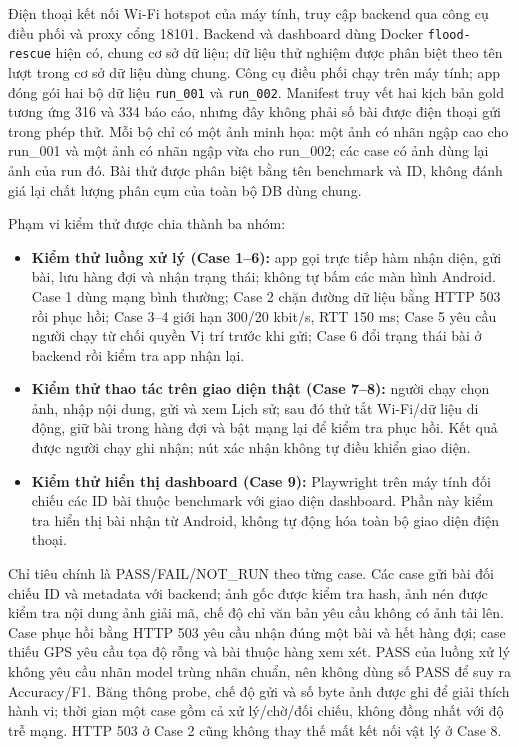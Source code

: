 Điện thoại kết nối Wi-Fi hotspot của máy tính, truy cập backend qua công cụ điều phối và proxy cổng 18101. Backend và dashboard dùng Docker \texttt{flood-rescue} hiện có, chung cơ sở dữ liệu; dữ liệu thử nghiệm được phân biệt theo tên lượt trong cơ sở dữ liệu dùng chung. Công cụ điều phối chạy trên máy tính; app đóng gói hai bộ dữ liệu \texttt{run\_001} và \texttt{run\_002}. Manifest truy vết hai kịch bản gold tương ứng 316 và 334 báo cáo, nhưng đây không phải số bài được điện thoại gửi trong phép thử. Mỗi bộ chỉ có một ảnh minh họa: một ảnh có nhãn ngập cao cho run\_001 và một ảnh có nhãn ngập vừa cho run\_002; các case có ảnh dùng lại ảnh của run đó. Bài thử được phân biệt bằng tên benchmark và ID, không đánh giá lại chất lượng phân cụm của toàn bộ DB dùng chung.

Phạm vi kiểm thử được chia thành ba nhóm:
\begin{itemize}
\item \textbf{Kiểm thử luồng xử lý (Case 1--6):} app gọi trực tiếp hàm nhận diện, gửi bài, lưu hàng đợi và nhận trạng thái; không tự bấm các màn hình Android. Case 1 dùng mạng bình thường; Case 2 chặn đường dữ liệu bằng HTTP 503 rồi phục hồi; Case 3--4 giới hạn 300/20 kbit/s, RTT 150 ms; Case 5 yêu cầu người chạy từ chối quyền Vị trí trước khi gửi; Case 6 đổi trạng thái bài ở backend rồi kiểm tra app nhận lại.
\item \textbf{Kiểm thử thao tác trên giao diện thật (Case 7--8):} người chạy chọn ảnh, nhập nội dung, gửi và xem Lịch sử; sau đó thử tắt Wi-Fi/dữ liệu di động, giữ bài trong hàng đợi và bật mạng lại để kiểm tra phục hồi. Kết quả được người chạy ghi nhận; nút xác nhận không tự điều khiển giao diện.
\item \textbf{Kiểm thử hiển thị dashboard (Case 9):} Playwright trên máy tính đối chiếu các ID bài thuộc benchmark với giao diện dashboard. Phần này kiểm tra hiển thị bài nhận từ Android, không tự động hóa toàn bộ giao diện điện thoại.
\end{itemize}

Chỉ tiêu chính là PASS/FAIL/NOT\_RUN theo từng case. Các case gửi bài đối chiếu ID và metadata với backend; ảnh gốc được kiểm tra hash, ảnh nén được kiểm tra nội dung ảnh giải mã, chế độ chỉ văn bản yêu cầu không có ảnh tải lên. Case phục hồi bằng HTTP 503 yêu cầu nhận đúng một bài và hết hàng đợi; case thiếu GPS yêu cầu tọa độ rỗng và bài thuộc hàng xem xét. PASS của luồng xử lý không yêu cầu nhãn model trùng nhãn chuẩn, nên không dùng số PASS để suy ra Accuracy/F1. Băng thông probe, chế độ gửi và số byte ảnh được ghi để giải thích hành vi; thời gian một case gồm cả xử lý/chờ/đối chiếu, không đồng nhất với độ trễ mạng. HTTP 503 ở Case 2 cũng không thay thế mất kết nối vật lý ở Case 8.

